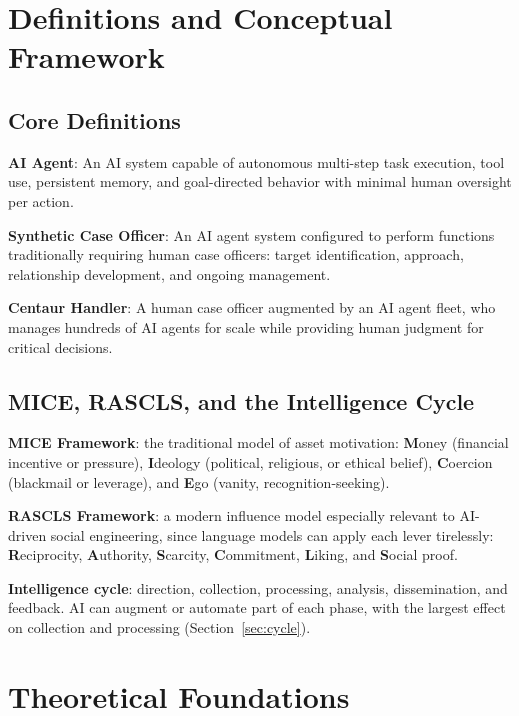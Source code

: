 \documentclass[11pt,letterpaper]{article}
\begin{document}
\section{Definitions and Conceptual Framework}\label{sec:definitions}

\subsection{Core Definitions}

\begin{defbox}
\setlength{\parskip}{0.5em}
\textbf{AI Agent}: An AI system capable of autonomous multi-step task execution, tool use, persistent memory, and goal-directed behavior with minimal human oversight per action.

\textbf{Synthetic Case Officer}: An AI agent system configured to perform functions traditionally requiring human case officers: target identification, approach, relationship development, and ongoing management.

\textbf{Centaur Handler}: A human case officer augmented by an AI agent fleet, who manages hundreds of AI agents for scale while providing human judgment for critical decisions.
\end{defbox}

\subsection{MICE, RASCLS, and the Intelligence Cycle}

\textbf{MICE Framework}: the traditional model of asset motivation: \textbf{M}oney (financial incentive or pressure), \textbf{I}deology (political, religious, or ethical belief), \textbf{C}oercion (blackmail or leverage), and \textbf{E}go (vanity, recognition-seeking).

\textbf{RASCLS Framework}: a modern influence model especially relevant to AI-driven social engineering, since language models can apply each lever tirelessly: \textbf{R}eciprocity, \textbf{A}uthority, \textbf{S}carcity, \textbf{C}ommitment, \textbf{L}iking, and \textbf{S}ocial proof.

\textbf{Intelligence cycle}: direction, collection, processing, analysis, dissemination, and feedback. AI can augment or automate part of each phase, with the largest effect on collection and processing (Section~\ref{sec:cycle}).

\section{Theoretical Foundations}\label{sec:theory}
\end{document}
